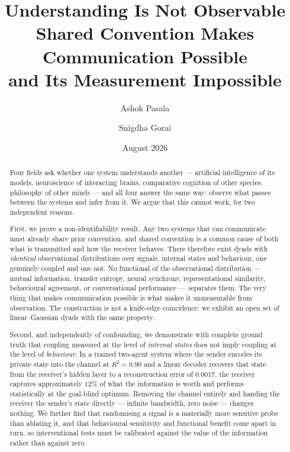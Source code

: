 \documentclass[11pt,a4paper]{article}
\title{\vspace{-1.2cm}\bfseries\Large Understanding Is Not Observable\\[6pt]
\large\mdseries Shared Convention Makes Communication Possible\\and Its Measurement Impossible}
\author[]{Ashok Pasala}
\author[]{Snigdha Gorai}
\affil[]{\normalsize VIT-AP University, Amaravati, Andhra Pradesh, India}
\affil[]{\small Correspondence: \href{mailto:ashokashishms@gmail.com}{\texttt{ashokashishms@gmail.com}}}
\date{August 2026}
\theoremstyle{plain}
\theoremstyle{definition}
\theoremstyle{remark}
\begin{document}
\maketitle
\thispagestyle{plain}

\begin{abstract}
\noindent
Four fields ask whether one system understands another --- artificial intelligence of its
models, neuroscience of interacting brains, comparative cognition of other species,
philosophy of other minds --- and all four answer the same way: observe what passes
between the systems and infer from it. We argue that this cannot work, for two
independent reasons.

First, we prove a non-identifiability result. Any two systems that can communicate must
already share prior convention, and shared convention is a common cause of both what is
transmitted and how the receiver behaves. There therefore exist dyads with \emph{identical}
observational distributions over signals, internal states and behaviour, one genuinely
coupled and one not. No functional of the observational distribution --- mutual
information, transfer entropy, neural synchrony, representational similarity, behavioural
agreement, or conversational performance --- separates them. The very thing that makes
communication possible is what makes it unmeasurable from observation. The construction is
not a knife-edge coincidence: we exhibit an open set of linear--Gaussian dyads with the
same property.

Second, and independently of confounding, we demonstrate with complete ground truth that
coupling measured at the level of \emph{internal states} does not imply coupling at the
level of \emph{behaviour}. In a trained two-agent system where the sender encodes its
private state into the channel at $R^2 = 0.90$ and a linear decoder recovers that state
from the receiver's hidden layer to a reconstruction error of $0.0017$, the receiver
captures approximately $12\%$ of what the information is worth and performs statistically
at the goal-blind optimum. Removing the channel entirely and handing the receiver the
sender's state directly --- infinite bandwidth, zero noise --- changes nothing. We further
find that randomising a signal is a materially more sensitive probe than ablating it, and
that behavioural sensitivity and functional benefit come apart in turn, so interventional
tests must be calibrated against the value of the information rather than against zero.


\end{abstract}
\end{document}
